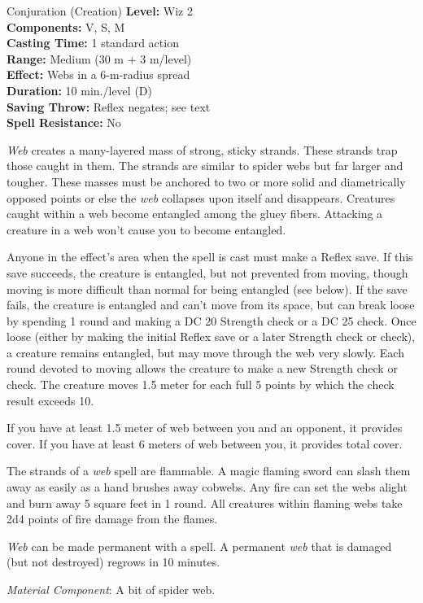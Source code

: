 {Conjuration (Creation)}
{
	\textbf{Level:}
	Wiz 2\\
	\textbf{Components:}
	V, S, M\\
	\textbf{Casting Time:}
	1 standard action\\
	\textbf{Range:}
	Medium (30 m + 3 m/level)\\
	\textbf{Effect:}
	Webs in a 6-m-radius spread\\
	\textbf{Duration:}
	10 min./level (D)\\
	\textbf{Saving Throw:}
	Reflex negates; see text\\
	\textbf{Spell Resistance:}
	No\\
}
{
	\emph{Web} creates a many-layered mass of strong, sticky strands. These strands trap those caught in them. The strands are similar to spider webs but far larger and tougher. These masses must be anchored to two or more solid and diametrically opposed points or else the \emph{web} collapses upon itself and disappears. Creatures caught within a web become entangled among the gluey fibers. Attacking a creature in a web won't cause you to become entangled.

	Anyone in the effect's area when the spell is cast must make a Reflex save. If this save succeeds, the creature is entangled, but not prevented from moving, though moving is more difficult than normal for being entangled (see below). If the save fails, the creature is entangled and can't move from its space, but can break loose by spending 1 round and making a DC 20 Strength check or a DC 25  check. Once loose (either by making the initial Reflex save or a later Strength check or  check), a creature remains entangled, but may move through the web very slowly. Each round devoted to moving allows the creature to make a new Strength check or  check. The creature moves 1.5 meter for each full 5 points by which the check result exceeds 10.

	If you have at least 1.5 meter of web between you and an opponent, it provides cover. If you have at least 6 meters of web between you, it provides total cover.

	The strands of a \emph{web} spell are flammable. A magic flaming sword can slash them away as easily as a hand brushes away cobwebs. Any fire can set the webs alight and burn away 5 square feet in 1 round. All creatures within flaming webs take 2d4 points of fire damage from the flames.

	\emph{Web} can be made permanent with a  spell. A permanent \emph{web} that is damaged (but not destroyed) regrows in 10 minutes.

	\textit{Material Component}:
	A bit of spider web.

}
